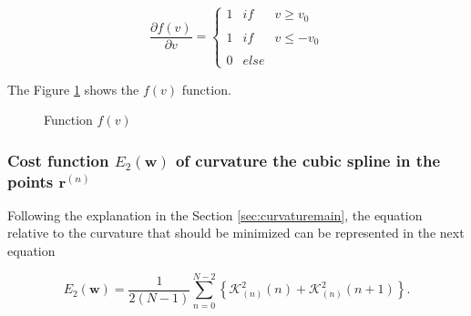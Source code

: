 \begin{equation}
\frac{\partial f(v)}{\partial v}=
\left\{
\begin{matrix}
1 & if &  v \geq  v_0 \\
& &\\
1 & if &  v \leq -v_0 \\
& &\\
0 & else & 
\end{matrix}
\right.
\end{equation}

The Figure \ref{fig:funcfv} shows the $f(v)$ function.

\begin{figure}[!ht]
\centering
{}
\caption{Function $f(v)$}
\label{fig:funcfv}
\end{figure}
\subsubsection{Cost function $E_{2}(\mathbf{w})$ of curvature the cubic spline in the points $\mathbf{r}^{(n)}$}

Following the explanation in the Section \ref{sec:curvaturemain},
the equation relative to the curvature that should be minimized can be represented in the next equation




\begin{equation}
E_{2}(\mathbf{w})
=
\frac{1}{2(N-1)}
\sum\limits_{n=0}^{N-2}
\left\{
\mathcal{K}_{(n)}^{2}(n)
+
\mathcal{K}_{(n)}^{2}(n+1)
\right\}.
\end{equation}

